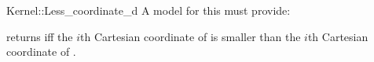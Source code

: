 \begin{ccRefFunctionObjectConcept}{Kernel::Less_coordinate_d}
A model for this must provide:


 {returns  iff  the $i$th Cartesian coordinate
  of  is
  smaller than  the $i$th Cartesian coordinate of .  }

\end{ccRefFunctionObjectConcept}
